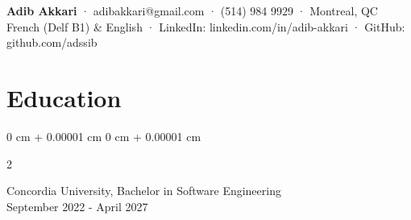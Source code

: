 \documentclass[10pt, letterpaper]{article}
\newenvironment{onecolentry}{
    \begin{adjustwidth}{
        0 cm + 0.00001 cm
    }{
        0 cm + 0.00001 cm
    }
}{
    \end{adjustwidth}
} %
\newenvironment{twocolentry}[2][]{
    \onecolentry
    \def\secondColumn{#2}
    \setcolumnwidth{\fill, 4.5 cm}
    \begin{paracol}{2}
}{
    \switchcolumn \raggedleft \secondColumn
    \end{paracol}
    \endonecolentry
} %
\begin{document}
\begin{center}
    \textbf{Adib Akkari} · adibakkari@gmail.com · (514) 984 9929 · Montreal, QC \\
    French (Delf B1) \& English · LinkedIn: linkedin.com/in/adib-akkari · GitHub: github.com/adssib
\end{center}
\vspace{-0.6cm}

\section{Education}        
\begin{twocolentry}{
    September 2022 - April 2027
}
    Concordia University, Bachelor in Software Engineering  \\
\end{twocolentry}

\vspace{-0.2cm}
\end{document}
